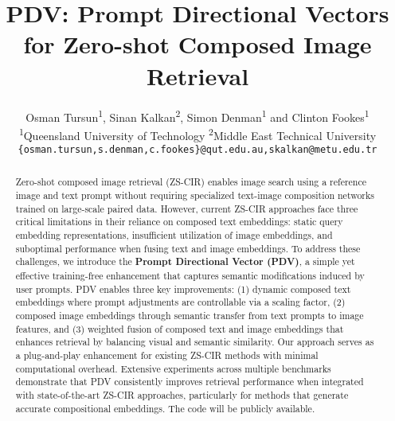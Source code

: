 \documentclass[10pt,twocolumn,letterpaper]{article}
\title{PDV: Prompt Directional Vectors for Zero-shot Composed Image Retrieval}
\author{Osman Tursun\textsuperscript{1}, Sinan Kalkan\textsuperscript{2}, Simon Denman\textsuperscript{1} and Clinton Fookes\textsuperscript{1}\\
	\textsuperscript{1}Queensland University of Technology	\textsuperscript{2}Middle East Technical University\\
	{\tt\small \{osman.tursun,s.denman,c.fookes\}@qut.edu.au,skalkan@metu.edu.tr}
}
\begin{document}
\maketitle
\begin{abstract}
Zero-shot composed image retrieval (ZS-CIR) enables image search using a reference image and text prompt without requiring specialized text-image composition networks trained on large-scale paired data. However, current ZS-CIR approaches face three critical limitations in their reliance on composed text embeddings: static query embedding representations, insufficient utilization of image embeddings, and suboptimal performance when fusing text and image embeddings. To address these challenges, we introduce the \textbf{Prompt Directional Vector (PDV)}, a simple yet effective training-free enhancement that captures semantic modifications induced by user prompts. PDV enables three key improvements: (1) dynamic composed text embeddings where prompt adjustments are controllable via a scaling factor, (2) composed image embeddings through semantic transfer from text prompts to image features, and (3) weighted fusion of composed text and image embeddings that enhances retrieval by balancing visual and semantic similarity. Our approach serves as a plug-and-play enhancement for existing ZS-CIR methods with minimal computational overhead. Extensive experiments across multiple benchmarks demonstrate that PDV consistently improves retrieval performance when integrated with state-of-the-art ZS-CIR approaches, particularly for methods that generate accurate compositional embeddings. The code will be publicly available.
\end{abstract}







\newpage
{\small


}


\end{document}
